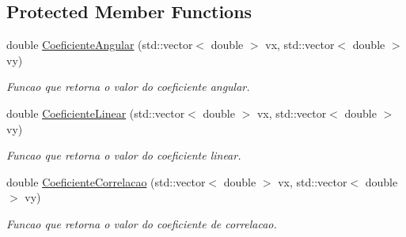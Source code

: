 \subsection*{Protected Member Functions}
\begin{DoxyCompactItemize}
\item 
\hypertarget{classCAjusteCurvaMinimosQuadrados_a19b822bde587b27923e67607f3a19c5b}{double \hyperlink{classCAjusteCurvaMinimosQuadrados_a19b822bde587b27923e67607f3a19c5b}{Coeficiente\-Angular} (std\-::vector$<$ double $>$ vx, std\-::vector$<$ double $>$ vy)}\label{classCAjusteCurvaMinimosQuadrados_a19b822bde587b27923e67607f3a19c5b}

\begin{DoxyCompactList}\small\item\em Funcao que retorna o valor do coeficiente angular. \end{DoxyCompactList}\item 
\hypertarget{classCAjusteCurvaMinimosQuadrados_a6f59fda309b84961724af2c065bff236}{double \hyperlink{classCAjusteCurvaMinimosQuadrados_a6f59fda309b84961724af2c065bff236}{Coeficiente\-Linear} (std\-::vector$<$ double $>$ vx, std\-::vector$<$ double $>$ vy)}\label{classCAjusteCurvaMinimosQuadrados_a6f59fda309b84961724af2c065bff236}

\begin{DoxyCompactList}\small\item\em Funcao que retorna o valor do coeficiente linear. \end{DoxyCompactList}\item 
\hypertarget{classCAjusteCurvaMinimosQuadrados_a5900f85b41ce140613d1ac31077549c5}{double \hyperlink{classCAjusteCurvaMinimosQuadrados_a5900f85b41ce140613d1ac31077549c5}{Coeficiente\-Correlacao} (std\-::vector$<$ double $>$ vx, std\-::vector$<$ double $>$ vy)}\label{classCAjusteCurvaMinimosQuadrados_a5900f85b41ce140613d1ac31077549c5}

\begin{DoxyCompactList}\small\item\em Funcao que retorna o valor do coeficiente de correlacao. \end{DoxyCompactList}\end{DoxyCompactItemize}
